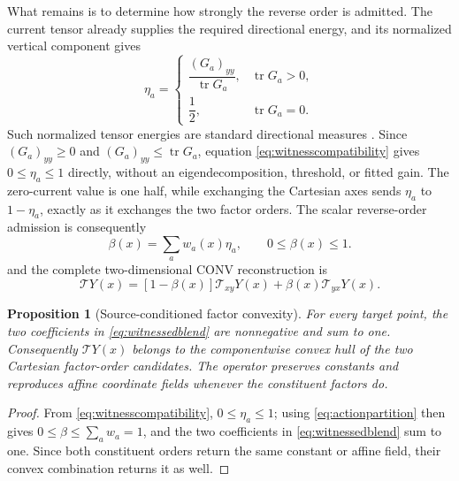 \documentclass[journal]{IEEEtran}
\newtheorem{proposition}{Proposition}
\newcommand{\Tcal}{\mathcal{T}}
\begin{document}
What remains is to determine how strongly the reverse order is admitted.
The current tensor already supplies the required directional energy, and its
normalized vertical component gives
\begin{equation}
 \eta_a=
 \begin{cases}
 \dfrac{(G_a)_{yy}}{\operatorname{tr}G_a},&\operatorname{tr}G_a>0,\\[5pt]
 \dfrac12,&\operatorname{tr}G_a=0.
 \end{cases}
 \label{eq:witnesscompatibility}
\end{equation}
Such normalized tensor energies are standard directional measures
\cite{bigun1987}. Since \((G_a)_{yy}\geq0\) and
\((G_a)_{yy}\leq\operatorname{tr}G_a\), equation
\eqref{eq:witnesscompatibility} gives \(0\leq\eta_a\leq1\) directly, without
an eigendecomposition, threshold, or fitted gain. The zero-current value is
one half, while exchanging the Cartesian axes sends \(\eta_a\) to
\(1-\eta_a\), exactly as it exchanges the two factor orders. The scalar
reverse-order admission is consequently
\begin{equation}
 \beta(x)=\sum_aw_a(x)\eta_a,
 \qquad 0\leq\beta(x)\leq1.
 \label{eq:actionadmission}
\end{equation}
and the complete two-dimensional CONV reconstruction is
\begin{equation}
 \boxed{
 \Tcal Y(x)=
 [1-\beta(x)]\Tcal_{xy}Y(x)+\beta(x)\Tcal_{yx}Y(x) .}
 \label{eq:witnessedblend}
\end{equation}

\begin{proposition}[Source-conditioned factor convexity]
For every target point, the two coefficients in
\eqref{eq:witnessedblend} are nonnegative and sum to one. Consequently
\(\Tcal Y(x)\) belongs to the componentwise convex hull of the two Cartesian
factor-order candidates. The operator preserves constants and reproduces
affine coordinate fields whenever the constituent factors do.
\end{proposition}

\begin{proof}
From \eqref{eq:witnesscompatibility},
\(0\leq\eta_a\leq1\); using \eqref{eq:actionpartition} then gives
\(0\leq\beta\leq\sum_aw_a=1\), and the two coefficients in
\eqref{eq:witnessedblend} sum to one. Since both constituent orders return
the same constant or affine field, their convex combination returns it as
well.
\end{proof}
\end{document}

